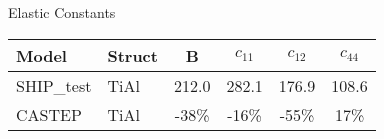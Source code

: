 \documentclass[preview]{standalone}
\begin{document}
    \begin{center}
    \textnormal{Elastic Constants} \\
    \vspace{2mm}
    \begin{tabular}{ l l c c c c } \toprule 
Model & Struct & B & $c_{11}$ & $c_{12}$ & $c_{44}$\\ \midrule 
SHIP\_test & TiAl & 212.0 & 282.1 & 176.9 & 108.6\\ 
CASTEP & TiAl & -38\% & -16\% & -55\% & 17\%\\ 
 \bottomrule
    \end{tabular}
    \end{center}
    
\end{document}
